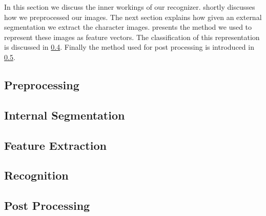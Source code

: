 In this section we discuss the inner workings of our recognizer.  shortly discusses how we preprocessed our images. The next section explains how given an external segmentation we extract the character images.  presents the method we used to represent these images as feature vectors. The classification of this representation is discussed in \cref{ss:methods:recognition}. Finally the method used for post processing is introduced in \cref{ss:methods:postprocessing}.

\subsection{Preprocessing}
\label{ss:methods:preprocessing}


\subsection{Internal Segmentation}
\label{ss:methods:characterSegmentation}


\subsection{Feature Extraction}
\label{ss:methods:featureExtraction}


\subsection{Recognition}
\label{ss:methods:recognition}


\subsection{Post Processing}
\label{ss:methods:postprocessing}
